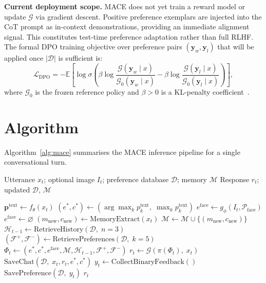 \documentclass[sigconf, review=true]{acmart}
\begin{document}
\textbf{Current deployment scope.}
MACE does not yet train a reward model or update $\mathcal{G}$
via gradient descent.
Positive preference exemplars are injected into the CoT prompt
as in-context demonstrations, providing an immediate alignment
signal.
This constitutes test-time preference adaptation rather than
full RLHF.
The formal DPO training objective over preference
pairs $(\mathbf{y}_w, \mathbf{y}_l)$ that will be applied
once $|\mathcal{D}|$ is sufficient is:
\begin{equation}
    \mathcal{L}_{\text{DPO}} =
    -\mathbb{E}\!\left[\log\sigma\!\left(
    \beta \log \frac{\mathcal{G}(\mathbf{y}_w \mid x)}
                    {\mathcal{G}_0(\mathbf{y}_w \mid x)}
    - \beta \log \frac{\mathcal{G}(\mathbf{y}_l \mid x)}
                      {\mathcal{G}_0(\mathbf{y}_l \mid x)}
    \right)\right],
    \label{eq:dpo}
\end{equation}
where $\mathcal{G}_0$ is the frozen reference policy and
$\beta{>}0$ is a KL-penalty coefficient~\cite{rafailov2023dpo}.

\section{Algorithm}
\label{sec:algorithm}

Algorithm~\ref{alg:mace} summarises the MACE inference pipeline
for a single conversational turn.

\begin{algorithm}
\caption{MACE: Single-Turn Inference}
\label{alg:mace}
\begin{algorithmic}[1]
\REQUIRE Utterance $x_t$; optional image $I_t$;
         preference database $\mathcal{D}$; memory $\mathcal{M}$
\ENSURE  Response $r_t$; updated $\mathcal{D}$, $\mathcal{M}$

\STATE $\mathbf{p}^{\text{text}} \leftarrow
       f_\theta(x_t)$ 
\STATE $(e^*, c^*) \leftarrow
       (\arg\max_k p^{\text{text}}_k,\;
        \max_k p^{\text{text}}_k)$
    \STATE $e^{\text{face}} \leftarrow
           g_\phi(I_t, \mathcal{P}_{\text{face}})$
\ELSE
    \STATE $e^{\text{face}} \leftarrow \varnothing$
\ENDIF
\STATE $(m_{\text{new}}, c_{\text{new}}) \leftarrow
       \text{MemoryExtract}(x_t)$ 
    \STATE $\mathcal{M} \leftarrow \mathcal{M} \cup
           \{(m_{\text{new}}, c_{\text{new}})\}$
\ENDIF
\STATE $\mathcal{H}_{t-1} \leftarrow
       \text{RetrieveHistory}(\mathcal{D},\; n{=}3)$
\STATE $(\mathcal{F}^+, \mathcal{F}^-) \leftarrow
       \text{RetrievePreferences}(\mathcal{D},\; k{=}5)$
\STATE $\Phi_t \leftarrow (e^*, c^*, e^{\text{face}},
       \mathcal{M}, \mathcal{H}_{t-1}, \mathcal{F}^+,
       \mathcal{F}^-)$ 
\STATE $r_t \leftarrow \mathcal{G}(\pi(\Phi_t),\; x_t)$
\STATE $\text{SaveChat}(\mathcal{D},\; x_t, r_t, e^*, c^*)$
\STATE $y_t \leftarrow \text{CollectBinaryFeedback}()$
\STATE $\text{SavePreference}(\mathcal{D},\; y_t)$
\RETURN $r_t$
\end{algorithmic}
\end{algorithm}
\end{document}
